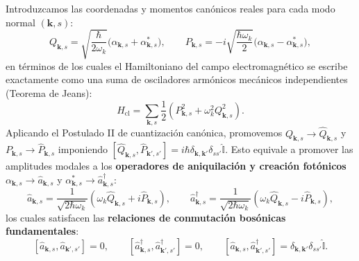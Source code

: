 \documentclass[11pt,a4paper,twoside]{report}
\theoremstyle{definition}
\theoremstyle{plain}
\theoremstyle{remark}
\newcommand{\comm}[2]{\left[ #1, #2 \right]}
\newcommand{\op}[1]{\hat{#1}}
\newcommand{\ident}{\hat{\mathbb{I}}}
\begin{document}
Introduzcamos las coordenadas y momentos canónicos reales para cada modo normal $(\bm{k},s)$:
\begin{equation}
    Q_{\bm{k},s} = \sqrt{\frac{\hbar}{2\omega_k}}\big(\alpha_{\bm{k},s} + \alpha_{\bm{k},s}^*\big), \qquad P_{\bm{k},s} = -i\sqrt{\frac{\hbar\omega_k}{2}}\big(\alpha_{\bm{k},s} - \alpha_{\bm{k},s}^*\big),
\end{equation}
en términos de los cuales el Hamiltoniano del campo electromagnético se escribe exactamente como una suma de osciladores armónicos mecánicos independientes (Teorema de Jeans):
\begin{equation}
    H_{\text{cl}} = \sum_{\bm{k},s} \frac{1}{2}\left( P_{\bm{k},s}^2 + \omega_k^2 Q_{\bm{k},s}^2 \right).
\end{equation}
Aplicando el Postulado II de cuantización canónica, promovemos $Q_{\bm{k},s} \to \op{Q}_{\bm{k},s}$ y $P_{\bm{k},s} \to \op{P}_{\bm{k},s}$ imponiendo $\comm{\op{Q}_{\bm{k},s}}{\op{P}_{\bm{k}',s'}} = i\hbar\delta_{\bm{k},\bm{k}'}\delta_{ss'}\ident$. Esto equivale a promover las amplitudes modales a los \textbf{operadores de aniquilación y creación fotónicos} $\alpha_{\bm{k},s} \to \op{a}_{\bm{k},s}$ y $\alpha_{\bm{k},s}^* \to \op{a}_{\bm{k},s}^\dagger$:
\begin{equation}
    \op{a}_{\bm{k},s} = \frac{1}{\sqrt{2\hbar\omega_k}}\left(\omega_k \op{Q}_{\bm{k},s} + i\op{P}_{\bm{k},s}\right), \qquad \op{a}_{\bm{k},s}^\dagger = \frac{1}{\sqrt{2\hbar\omega_k}}\left(\omega_k \op{Q}_{\bm{k},s} - i\op{P}_{\bm{k},s}\right),
\end{equation}
los cuales satisfacen las \textbf{relaciones de conmutación bosónicas fundamentales}:
\begin{equation}
    \comm{\op{a}_{\bm{k},s}}{\op{a}_{\bm{k}',s'}} = 0, \qquad \comm{\op{a}_{\bm{k},s}^\dagger}{\op{a}_{\bm{k}',s'}^\dagger} = 0, \qquad \comm{\op{a}_{\bm{k},s}}{\op{a}_{\bm{k}',s'}^\dagger} = \delta_{\bm{k},\bm{k}'}\delta_{ss'}\ident.
\end{equation}
\end{document}
